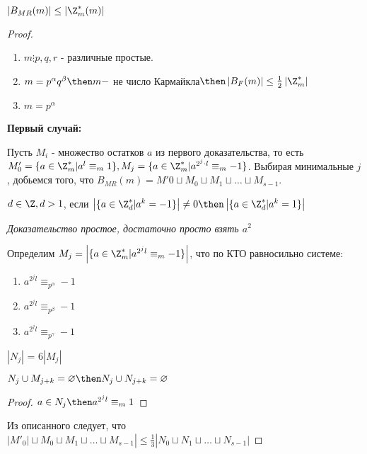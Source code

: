 \begin{proposition}
    $\left|B_{MR}(m)\right| \le \left|\Z_m^*(m)\right|$
\end{proposition}
\begin{proof}
    \begin{enumerate}
        \item $m \vdots p, q, r$ - различные простые.
        \item $m = p^\alpha q^\beta \then m - $ не число Кармайкла$\then \left| B_F(m)\right| \le \frac{1}{2}\left|\Z_m^*\right|$
        \item $m = p ^ \alpha$
    \end{enumerate} 

    \textbf{Первый случай:}
    
    Пусть $M_i$ - множество остатков $a$ из первого доказательства, то есть $M_0' = \{a \in \Z_m^* | a^l \equiv_m 1\}, M_j = \{a \in \Z_m^* | a^{2^j \cdot l} \equiv_m -1\}$. Выбирая минимальные $j$, добьемся того, что $B_{MR}(m) = M'0 \sqcup M_0 \sqcup M_1 \sqcup \dots \sqcup M_{s-1}$.

    \begin{proposition}
        $d \in \Z, d > 1$, если $\left|\{a \in \Z_d^* | a^k = -1\}\right| \ne 0 \then \left|\{a \in \Z_d^* | a^k = 1\}\right|$
    \end{proposition}

    \textit{Доказательство простое, достаточно просто взять $a^2$}

    Определим $M_j = \left|\{a \in \Z_m^* | a^{2^j l} \equiv_m -1\}\right|$, что по КТО равносильно системе:
    \begin{enumerate}
        \item $a^{2^j l} \equiv_{p^\alpha} -1$
        \item $a^{2^j l} \equiv_{p^\beta} -1$
         \item $a^{2^j l} \equiv_{p^\gamma} -1$
    \end{enumerate}
    
    \begin{proposition}
        $|N_j|$ = $6 |M_j|$ 
    \end{proposition}

    \begin{proposition}
        $N_j \cup M_{j + k} = \varnothing \then N_j \cup N_{j + k} = \varnothing$
    \end{proposition}

    \begin{proof}
        $a \in N_j \then a^{2^{j}l} \equiv_{m} 1 $
    \end{proof}

    Из описанного следует, что $|M'_0| \sqcup M_0 \sqcup M_1 \sqcup \dots \sqcup M_{s - 1}| \le \frac{1}{3} |N_0 \sqcup N_1 \sqcup \dots \sqcup N_{s - 1}|$
\end{proof}

